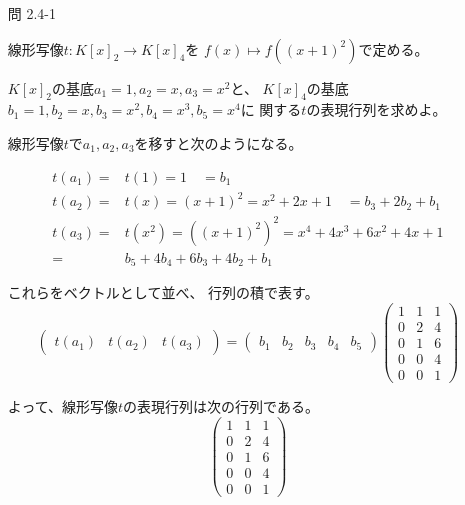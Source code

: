 \documentclass[12pt,b5paper]{ltjsarticle}
\begin{document}
\begin{enumerate}
       \hrulefill

 \item [問 2.4-1]

       線形写像$t:K[x]_2 \to K[x]_4$を
       $f(x)\mapsto f((x+1)^2)$で定める。

       $K[x]_2$の基底$a_1=1,a_2=x,a_3=x^2$と、
       $K[x]_4$の基底$b_1=1,b_2=x,b_3=x^2,b_4=x^3,b_5=x^4$に
       関する$t$の表現行列を求めよ。

       \dotfill

       線形写像$t$で$a_1,a_2,a_3$を移すと次のようになる。

       \begin{align}
        t(a_1) =& t(1) = 1
        \quad = b_1\\
        t(a_2) =& t(x) = (x+1)^2 = x^2+2x+1
        \quad = b_3 + 2b_2 + b_1\\
        t(a_3) =& t(x^2) = ((x+1)^2)^2
        = x^4 + 4x^3 + 6x^2 + 4x + 1\\
        =& b_5 + 4b_4 + 6b_3 + 4b_2 + b_1
       \end{align}

       これらをベクトルとして並べ、
       行列の積で表す。
       \begin{equation}
        \begin{pmatrix} t(a_1) & t(a_2) & t(a_3) \end{pmatrix}
        =
         \begin{pmatrix} b_1 & b_2 & b_3 & b_4 & b_5 \end{pmatrix}
         \begin{pmatrix}
          1 & 1 & 1 \\
          0 & 2 & 4 \\
          0 & 1 & 6 \\
          0 & 0 & 4 \\
          0 & 0 & 1
         \end{pmatrix}
       \end{equation}

       よって、線形写像$t$の表現行列は次の行列である。
       \begin{equation}
         \begin{pmatrix}
          1 & 1 & 1 \\
          0 & 2 & 4 \\
          0 & 1 & 6 \\
          0 & 0 & 4 \\
          0 & 0 & 1
         \end{pmatrix}
       \end{equation}



\end{enumerate}
\end{document}
